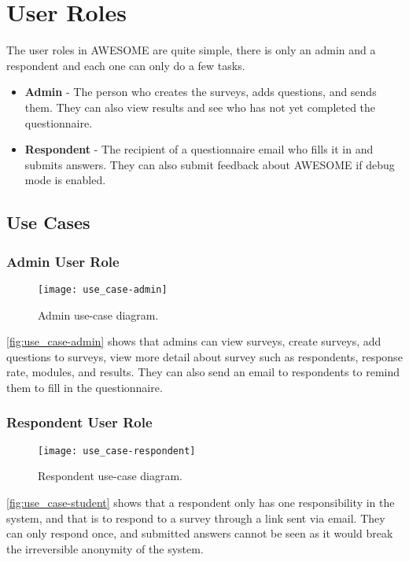 	\section{User Roles}
	
	The user roles in \ac{AWESOME} are quite simple, there is only an admin and a respondent and each one can only do a few tasks.
	
	\begin{itemize}
		\item \textbf{Admin} - The person who creates the surveys, adds questions, and sends them. They can also view results and see who has not yet completed the questionnaire.
		\item \textbf{Respondent} - The recipient of a questionnaire email who fills it in and submits answers. They can also submit feedback about \ac{AWESOME} if debug mode is enabled.
	\end{itemize}
	
	\subsection{Use Cases}
	
	\subsubsection{Admin User Role}
	
	\begin{figure}[H]
		\texttt{[image: use\_case-admin]}
		\caption{Admin use-case diagram.}
		\label{fig:use_case-admin}
	\end{figure}
	
	\autoref{fig:use_case-admin} shows that admins can view surveys, create surveys, add questions to surveys, view more detail about survey such as respondents, response rate, modules, and results.
	They can also send an email to respondents to remind them to fill in the questionnaire.
	
	\newpage
	
	\subsubsection{Respondent User Role}
	
	\begin{figure}[H]
		\label{fig:use_case-student}
		\texttt{[image: use\_case-respondent]}
		\caption{Respondent use-case diagram.}
	\end{figure}
	
	\autoref{fig:use_case-student} shows that a respondent only has one responsibility in the system, and that is to respond to a survey through a link sent via email.
	They can only respond once, and submitted answers cannot be seen as it would break the irreversible anonymity of the system.